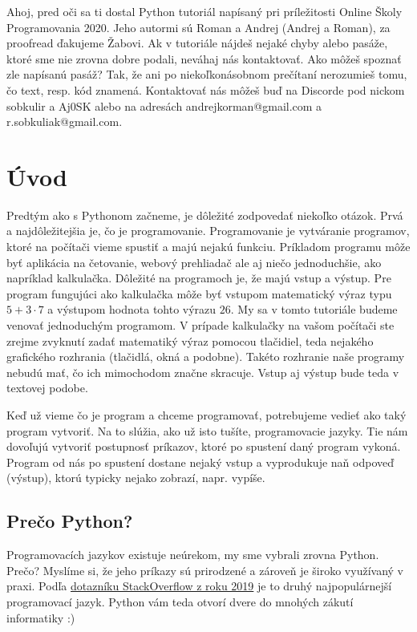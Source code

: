 \documentclass{article}
\begin{document}
\tableofcontents
\newpage

Ahoj, pred oči sa ti dostal Python tutoriál napísaný pri príležitosti Online Školy Programovania 2020. Jeho autormi sú Roman a Andrej (Andrej a Roman), za proofread ďakujeme Žabovi. Ak v tutoriále nájdeš nejaké chyby alebo pasáže, ktoré sme nie zrovna dobre podali, neváhaj nás kontaktovať. Ako môžeš spoznať zle napísanú pasáž? Tak, že ani po niekoľkonásobnom prečítaní nerozumieš tomu, čo text, resp. kód znamená. Kontaktovať nás môžeš buď na Discorde pod nickom sobkulir a Aj0SK alebo na adresách andrejkorman@gmail.com a r.sobkuliak@gmail.com.

\section{Úvod}
Predtým ako s Pythonom začneme, je dôležité zodpovedať niekoľko otázok. Prvá a najdôležitejšia je, čo je programovanie. Programovanie je vytváranie programov, ktoré na počítači vieme spustiť a majú nejakú funkciu. Príkladom programu môže byť aplikácia na četovanie, webový prehliadač ale aj niečo jednoduchšie, ako napríklad kalkulačka. Dôležité na programoch je, že majú vstup a výstup. Pre program fungujúci ako kalkulačka môže byť vstupom matematický výraz typu $5+3\cdot 7$ a výstupom hodnota tohto výrazu $26$. My sa v tomto tutoriále budeme venovať jednoduchým programom. V prípade kalkulačky na vašom počítači ste zrejme zvyknutí zadať matematiký výraz pomocou tlačidiel, teda nejakého grafického rozhrania (tlačidlá, okná a podobne). Takéto rozhranie naše programy nebudú mať, čo ich mimochodom značne skracuje. Vstup aj výstup bude teda v textovej podobe.

Keď už vieme čo je program a chceme programovať, potrebujeme vedieť ako taký program vytvoriť. Na to slúžia, ako už isto tušíte, programovacie jazyky. Tie nám dovoľujú vytvoriť postupnosť príkazov, ktoré po spustení daný program vykoná. Program od nás po spustení dostane nejaký vstup a vyprodukuje naň odpoveď (výstup), ktorú typicky nejako zobrazí, napr. vypíše.

\subsection{Prečo Python?}
Programovacích jazykov existuje neúrekom, my sme vybrali zrovna Python. Prečo? Myslíme si, že jeho príkazy sú prirodzené a zároveň je široko využívaný v praxi. Podľa \href{https://insights.stackoverflow.com/survey/2019#technology-_-programming-scripting-and-markup-languages}{dotazníku StackOverflow z roku 2019} je to druhý najpopulárnejší programovací jazyk. Python vám teda otvorí dvere do mnohých zákutí informatiky :)
\end{document}
